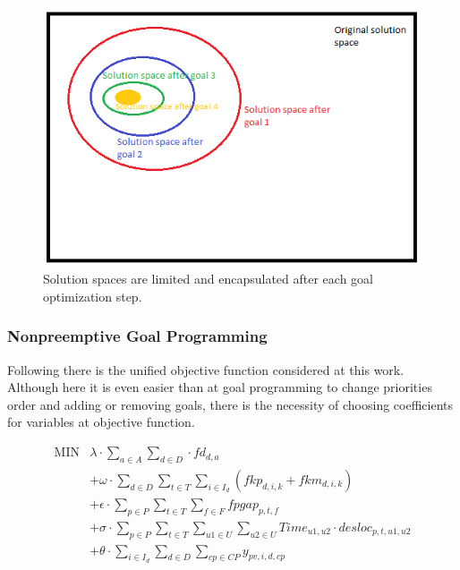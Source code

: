 \begin{figure}[h]
\includegraphics[scale=0.6]{figures/goalProgSpace.png}
\centering
\caption{Solution spaces are limited and encapsulated after each goal optimization step.}
\end{figure}



\subsubsection{Nonpreemptive Goal Programming}

Following there is the unified objective function considered at this work. Although here it is even easier than at goal programming to change priorities order and adding or removing goals, there is the necessity of choosing coefficients for variables at objective function.

$$
\begin{array}{rl}
   \mbox{MIN} &
			\lambda \cdot \sum\limits_{a \in A}\sum\limits_{d \in D} \cdot fd_{d,a}
      \\
      &
      + \omega \cdot \sum\limits_{d \in D} 
\sum\limits_{t \in T} \sum\limits_{i \in I_{d}} (fkp_{d,i,k} + fkm_{d,i,k})
      \\
      &
      + \epsilon \cdot \sum\limits_{p \in P} \sum\limits_{t \in T} \sum\limits_{f \in F} fpgap_{p,t,f}
      \\
      &
			+ \sigma \cdot \sum\limits_{p \in P} \sum\limits_{t \in T} \sum\limits_{u1 \in U} \sum\limits_{u2 \in U} Time_{u1,u2} \cdot desloc_{p,t,u1,u2}
			\\
			&
      + \theta \cdot \sum\limits_{i \in I_{d}} \sum\limits_{d \in D} \sum\limits_{cp \in CP} y_{pv,i,d,cp}
\end{array}
$$


